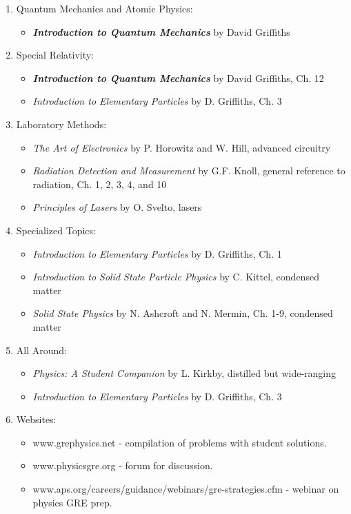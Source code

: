 \begin{enumerate}
    \item Quantum Mechanics and Atomic Physics: 
    \begin{itemize}
        \item {\itshape \bfseries Introduction to Quantum Mechanics} by David Griffiths 
    \end{itemize}
    
    \item Special Relativity: 
    \begin{itemize}
        \item {\itshape \bfseries Introduction to Quantum Mechanics} by David Griffiths, Ch. 12
        \item {\itshape Introduction to Elementary Particles} by D. Griffiths, Ch. 3
    \end{itemize}
    
    \item Laboratory Methods: 
    \begin{itemize}
        \item {\itshape The Art of Electronics} by P. Horowitz and W. Hill, advanced circuitry
        \item {\itshape Radiation Detection and Measurement} by G.F. Knoll, general reference to radiation, Ch. 1, 2, 3, 4, and 10
        \item {\itshape Principles of Lasers} by O. Svelto, lasers
    \end{itemize}
    
    \item Specialized Topics: 
    \begin{itemize}
        \item {\itshape Introduction to Elementary Particles} by D. Griffiths, Ch. 1
        \item {\itshape Introduction to Solid State Particle Physics} by C. Kittel, condensed matter
        \item {\itshape Solid State Physics} by N. Ashcroft and N. Mermin, Ch. 1-9, condensed matter
    \end{itemize}
    
    \item All Around: 
    \begin{itemize}
        \item {\itshape Physics: A Student Companion} by L. Kirkby, distilled but wide-ranging
        \item {\itshape Introduction to Elementary Particles} by D. Griffiths, Ch. 3
    \end{itemize}
    
    \item Websites:
    \begin{itemize}
        \item www.grephysics.net - compilation of problems with student solutions.
        \item www.physicsgre.org - forum for discussion.
        \item www.aps.org/careers/guidance/webinars/gre-strategies.cfm - webinar on physics GRE prep.
    \end{itemize}
\end{enumerate}